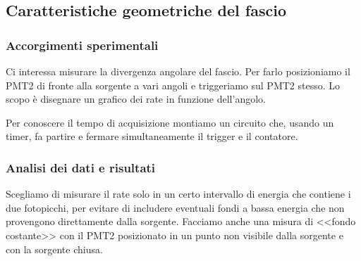 \subsection{Caratteristiche geometriche del fascio}

\subsubsection{Accorgimenti sperimentali}

Ci interessa misurare la divergenza angolare del fascio.
Per farlo posizioniamo il PMT2 di fronte alla sorgente a vari angoli e triggeriamo sul PMT2 stesso. Lo scopo è disegnare un grafico dei rate in funzione dell'angolo.

Per conoscere il tempo di acquisizione montiamo un circuito che, usando un timer,
fa partire e fermare simultaneamente il trigger e il contatore.

\subsubsection{Analisi dei dati e risultati}

Scegliamo di misurare il rate solo in un certo intervallo di energia che contiene i due fotopicchi,
per evitare di includere eventuali fondi a bassa energia che non provengono direttamente dalla sorgente.
Facciamo anche una misura di <<fondo costante>> con il PMT2 posizionato in un punto non visibile dalla sorgente e con la sorgente chiusa.

